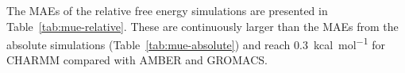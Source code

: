 \documentclass[journal=jctcce,manuscript=article]{achemso}
\begin{document}
The MAEs of the relative free energy simulations are presented in 
Table~\ref{tab:mue-relative}.  These are continuously larger than the MAEs from 
the absolute simulations (Table~\ref{tab:mue-absolute}) and reach 
\SI{0.3}{kcal.mol^{-1}} for CHARMM compared with AMBER and GROMACS.
\begin{table}[]
  \begin{minipage}{\linewidth}
    \caption{MAE (in \si{kcal.mol^{-1}}) comparing relative free energies from 
      relative simulations between SOMD, GROMACS, AMBER and 
      CHARMM.}\label{tab:mue-relative}
  \end{minipage}
\end{table}

\end{document}
